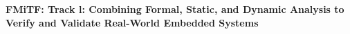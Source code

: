 \documentclass[11pt]{article}
\begin{document}
\begin{center}
  \Large\bf FMiTF: Track l: Combining Formal, Static, and
  Dynamic Analysis to Verify and Validate Real-World Embedded Systems
\end{center}
















\newpage
\setcounter{page}{1}



\end{document}
